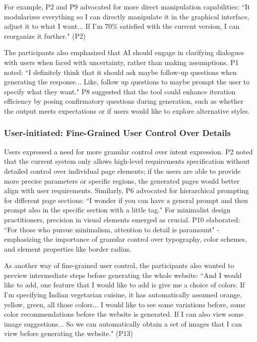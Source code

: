 For example, P2 and P9 advocated for more direct manipulation capabilities: ``It modularizes everything so I can directly manipulate it in the graphical interface, adjust it to what I want... If I'm 70\% satisfied with the current version, I can reorganize it further." (P2)

The participants also emphasized that AI should engage in clarifying dialogues with users when faced with uncertainty, rather than making assumptions. P1 noted: ``I definitely think that it should ask maybe follow-up questions when generating the response... Like, follow up questions to maybe prompt the user to specify what they want." P8 suggested that the tool could enhance iteration efficiency by posing confirmatory questions during generation, such as whether the output meets expectations or if users would like to explore alternative styles.

\subsubsection{User-initiated: Fine-Grained User Control Over Details}

Users expressed a need for more granular control over intent expression. P2 noted that the current system only allows high-level requirements specification without detailed control over individual page elements; if the users are able to provide more precise parameters or specific regions, the generated pages would better align with user requirements. Similarly, P6 advocated for hierarchical prompting for different page sections: ``I wonder if you can have a general prompt and then prompt also in the specific section with a little tag." For minimalist design practitioners, precision in visual elements emerged as crucial. P10 elaborated: ``For those who pursue minimalism, attention to detail is paramount" - emphasizing the importance of granular control over typography, color schemes, and element properties like border radius.

As another way of fine-grained user control, the participants also wanted to preview intermediate steps before generating the whole website: ``And I would like to add, one feature that I would like to add is give me a choice of colors. If I'm specifying Indian vegetarian cuisine, it has automatically assumed orange, yellow, green, all those colors... I would like to see some variations before, some color recommendations before the website is generated. If I can also view some image suggestions... So we can automatically obtain a set of images that I can view before generating the website." (P13)

